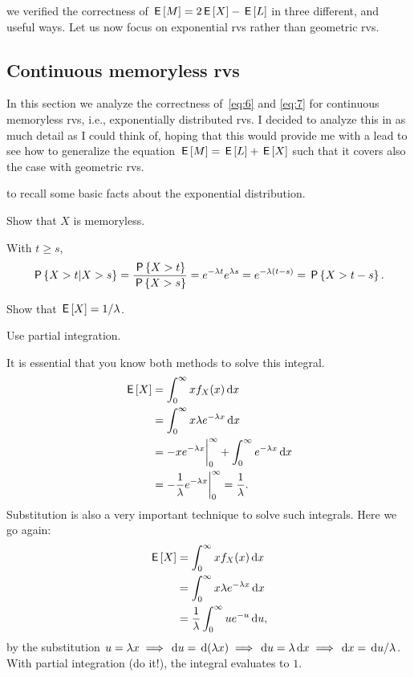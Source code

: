  we verified the correctness of $\E M = 2\E X - \E L$ in three different, and useful ways. Let us now focus on exponential rvs rather than geometric rvs.

\subsection{Continuous memoryless rvs}
\label{sec:exerc-expon-distr}

In this section we analyze the correctness of~\cref{eq:6} and \cref{eq:7} for continuous memoryless rvs, i.e., exponentially distributed rvs.
I decided to analyze this in as much detail as I could think of, hoping that this would provide me with a lead to see how to generalize the equation $\E M = \E L + \E X$ such that it covers also the case with  geometric rvs.



 to recall some basic facts about the exponential distribution.

\begin{exercise}
Show that $X$ is memoryless.
\begin{solution}
With $t \geq s$,
\begin{equation*}
\P{X>t|X>s} = \frac{\P{X>t}}{\P{X>s}} = e^{-\lambda t} e^{\lambda s} = e^{-\lambda(t-s)} = \P{X>t - s}.
\end{equation*}

\end{solution}
\end{exercise}


\begin{exercise}
Show that $\E X = 1/\lambda$.
\begin{hint}
  Use partial integration.
\end{hint}
\begin{solution}
It is essential that  you know both methods to solve this integral.
  \begin{align*}
\E X
&= \int_{0}^{\infty}  x f_{X}(x) \d x  \\
&= \int_{0}^{\infty}  x \lambda e^{-\lambda x} \d x  \\
&= - xe^{-\lambda x} \biggr|_{0}^{\infty} + \int_{0}^{\infty}  e^{-\lambda x} \d x  \\
&=  - \frac 1 \lambda e^{-\lambda x} \biggr|_{0}^{\infty} = \frac 1 \lambda.
  \end{align*}
Substitution is also a very important technique to solve such integrals. Here we go again:
  \begin{align*}
\E X
&= \int_{0}^{\infty}  x f_{X}(x) \d x  \\
&= \int_{0}^{\infty}  x \lambda e^{-\lambda x} \d x  \\
&= \frac 1 \lambda \int_{0}^{\infty}  u  e^{- u} \d u,
  \end{align*}
  by the substitution $u=\lambda x \implies \d u = \d (\lambda x) \implies \d u = \lambda \d x \implies \d x = \d u / \lambda$.
  With partial integration (do it!), the integral evaluates to $1$.
\end{solution}
\end{exercise}



